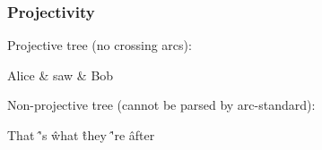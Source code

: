 \documentclass[t]{beamer}
\begin{document}
\begin{frame}
    \frametitle{Projectivity}
    Projective tree (no crossing arcs):
  \begin{center}
	\begin{dependency}
	\begin{deptext}[column sep=.7cm]
	Alice \& saw \& Bob \\
	\end{deptext}
	\end{dependency}
	\end{center}
	
	Non-projective tree (cannot be parsed by arc-standard):
  \begin{center}
    \begin{dependency}
      \begin{deptext}[column sep=1.5em,ampersand replacement=\^,font=\rmfamily]
        That \^ 's \^ what \^ they \^ 're \^ after \\
      \end{deptext}
    \end{dependency}
  \end{center}
\end{frame}
\end{document}
